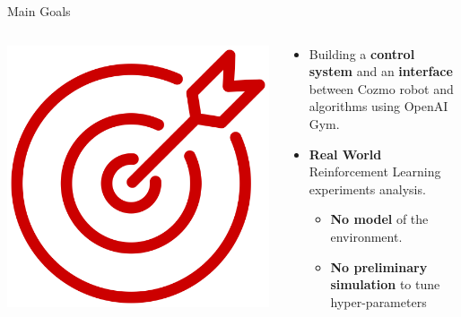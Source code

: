 \documentclass[aspectratio=169]{beamer}
\begin{document}
\begin{frame}{Main Goals}
	\begin{columns}
		\begin{column}{0.4\linewidth}
			\centering
			\includegraphics[width=0.6\linewidth]{img/goal.png}
		\end{column}
		\begin{column}{0.6\linewidth}
				\begin{itemize}[<+- | alert@+>]
					\item{Building a \textbf{control system} and an \textbf{interface} between Cozmo robot and algorithms using OpenAI Gym.}
					\item \textbf{Real World} Reinforcement Learning experiments analysis.
					\begin{itemize}
						\item\textbf{No model} of the environment.
						\item\textbf{No preliminary simulation} to tune hyper-parameters
					\end{itemize}
				\end{itemize}
		\end{column}
	\end{columns}
\end{frame}
\end{document}
